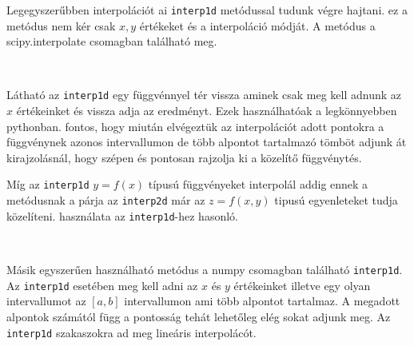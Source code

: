     Legegyszerűbben interpolációt ai \texttt{interp1d} metódussal tudunk
végre hajtani. ez a metódus nem kér csak \(x,y\) értékeket és a
interpoláció módját. A metódus a scipy.interpolate csomagban található
meg.

\begin{python}

\end{python}

    \begin{center}
    \end{center}
    { \hspace*{\fill} \\}
    
    Látható az \texttt{interp1d} egy függvénnyel tér vissza aminek csak meg
kell adnunk az \(x\) értékeinket és vissza adja az eredményt. Ezek
használhatóak a legkönnyebben pythonban. fontos, hogy miután elvégeztük
az interpolációt adott pontokra a függvénynek azonos intervallumon de
több alpontot tartalmazó tömböt adjunk át kirajzolásnál, hogy szépen és
pontosan rajzolja ki a közelítő függvénytés.

    Míg az \texttt{interp1d} \(y=f(x)\) típusú függvényeket interpolál addig
ennek a metódusnak a párja az \texttt{interp2d} már az \(z=f(x, y)\)
tipusú egyenleteket tudja közelíteni. használata az
\texttt{interp1d}-hez hasonló.

\begin{python}

\end{python}

    \begin{center}
    \end{center}
    { \hspace*{\fill} \\}
    
    Másik egyszerűen használható metódus a numpy csomagban található
\texttt{interp1d}. Az \texttt{interp1d} esetében meg kell adni az \(x\)
és \(y\) értékeinket illetve egy olyan intervallumot az \([a,b]\)
intervallumon ami több alpontot tartalmaz. A megadott alpontok számától
függ a pontosság tehát lehetőleg elég sokat adjunk meg. Az
\texttt{interp1d} szakaszokra ad meg lineáris interpolácót.

\begin{python}

\end{python}

